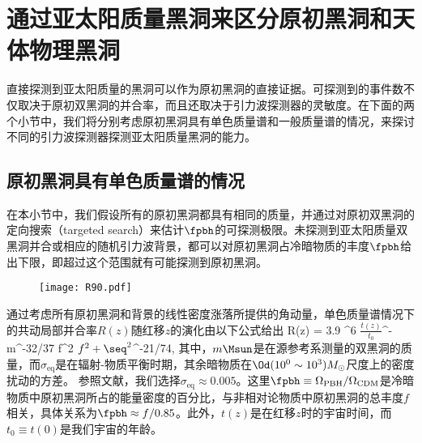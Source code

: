 \section{\label{subsolar}通过亚太阳质量黑洞来区分原初黑洞和天体物理黑洞}
直接探测到亚太阳质量的黑洞可以作为原初黑洞的直接证据。可探测到的事件数不仅取决于原初双黑洞的并合率，而且还取决于引力波探测器的灵敏度。在下面的两个小节中，我们将分别考虑原初黑洞具有单色质量谱和一般质量谱的情况，来探讨不同的引力波探测器探测亚太阳质量黑洞的能力。

\subsection{\label{mono}原初黑洞具有单色质量谱的情况}
在本小节中，我们假设所有的原初黑洞都具有相同的质量，并通过对原初双黑洞的定向搜索（targeted search）来估计$\fpbh$的可探测极限。未探测到亚太阳质量双黑洞并合或相应的随机引力波背景，都可以对原初黑洞占冷暗物质的丰度$\fpbh$给出下限，即超过这个范围就有可能探测到原初黑洞。

\begin{figure}[h]
    \centering
    \texttt{[image: R90.pdf]}
\end{figure}

通过考虑所有原初黑洞和背景的线性密度涨落所提供的角动量，单色质量谱情况下的共动局部并合率$R(z)$随红移$z$的演化由以下公式给出\cite{Ali-Haimoud:2017rtz,Chen:2018czv}
\e\label{mono_R} 
R(z) = 3.9 ^6 \times \({\frac{t(z)}{t_0}}\)^{-}
m^{-32/37} f^2 \(f^2 + \seq^2\)^{-21/74},
\q 
其中，$m \Msun$是在源参考系测量的双黑洞的质量，而$\sigma_{\mathrm{eq}}$是在辐射-物质平衡时期，其余暗物质在$\Od(10^0\sim10^3) M_\odot$尺度上的密度扰动的方差。
参照文献\cite{Ali-Haimoud:2017rtz,Chen:2018czv}，我们选择$\sigma_{\mathrm{eq}}\approx 0.005$。这里$\fpbh \equiv \Omega_{\mathrm{PBH}}/\Omega_{\mathrm{CDM}}$是冷暗物质中原初黑洞所占的能量密度的百分比，与非相对论物质中原初黑洞的总丰度$f$相关，具体关系为$\fpbh \approx f/0.85$。此外，$t(z)$是在红移$z$时的宇宙时间，而$t_0\equiv t(0)$是我们宇宙的年龄。

